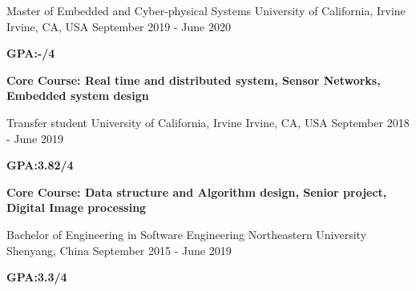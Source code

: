 
\begin{cventries}

  \cventry
    {Master of Embedded and Cyber-physical Systems} %
    {University of California, Irvine} %
    {Irvine, CA, USA} %
    {September 2019 - June 2020} %
    {
      \begin{cvitems} %
         \item {\textbf{GPA:-/4}}
         \item {\textbf{Core Course: Real time and distributed system, Sensor Networks, Embedded system design}}
      \end{cvitems}
    }

  \cventry
    {Transfer student} %
    {University of California, Irvine} %
    {Irvine, CA, USA} %
    {September 2018 - June 2019} %
    {
      \begin{cvitems} %
         \item {\textbf{GPA:3.82/4}}
         \item{\textbf{Core Course: Data structure and Algorithm design, Senior project, Digital Image processing}}
      \end{cvitems}
    }
    
  \cventry
    {Bachelor of Engineering in Software Engineering} %
    {Northeastern University} %
    {Shenyang, China} %
    {September 2015 - June 2019} %
    {
      \begin{cvitems} %
         \item {\textbf{GPA:3.3/4}}
      \end{cvitems}
    }

    
\end{cventries}
